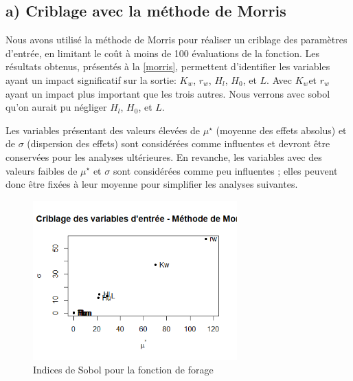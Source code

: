 \documentclass[a4paper,12pt]{article}
\begin{document}
\subsection{a) Criblage avec la méthode de Morris}
Nous avons utilisé la méthode de Morris pour réaliser un criblage des paramètres d'entrée, en limitant le coût à moins de 100 évaluations de la fonction. Les résultats obtenus, présentés à la \autoref{morris}, permettent d'identifier les variables ayant un impact significatif sur la sortie: \(K_w\), \(r_w\), \(H_l\), \(H_0\), et \(L\). Avec \(K_w\)et \(r_w\) ayant un impact plus important que les trois autres. Nous verrons avec sobol qu'on aurait pu négliger \(H_l\), \(H_0\), et \(L\). 

Les variables présentant des valeurs élevées de $\mu^\star$ (moyenne des effets absolus) et de $\sigma$ (dispersion des effets) sont considérées comme influentes et devront être conservées pour les analyses ultérieures. En revanche, les variables avec des valeurs faibles de $\mu^\star$ et $\sigma$ sont considérées comme peu influentes ; elles peuvent donc être fixées à leur moyenne pour simplifier les analyses suivantes.
\begin{figure}[h!]
    \centering
    \includegraphics[width=0.7\textwidth]{morris.png}
    \caption{Indices de Sobol pour la fonction de forage}
    \label{morris}
\end{figure}
\\
\end{document}
